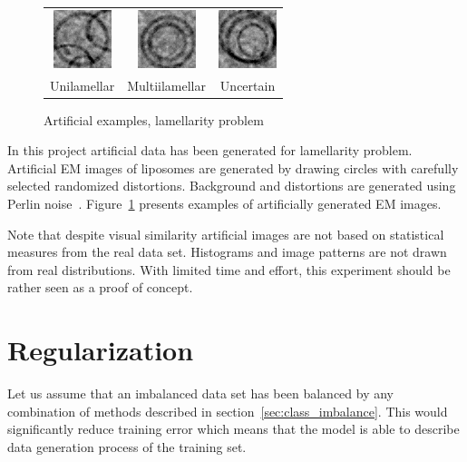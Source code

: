 \documentclass[a4paper, 11pt, table]{article}
\begin{document}
\begin{figure}[H]
\centering
\begin{tabular}{ccc}
	\includegraphics[scale=1.5]{synthetic/uni.png} & \includegraphics[scale=1.5]{synthetic/multi.png} & \includegraphics[scale=1.5]{synthetic/uncertain.png} \\
	Unilamellar & Multiilamellar & Uncertain \\[6pt]
\end{tabular}
\caption{Artificial examples, lamellarity problem}
\label{fig:synthetic_images}
\end{figure}

In this project artificial data has been generated for lamellarity problem. Artificial EM images of liposomes are generated by drawing circles with carefully selected randomized distortions. Background and distortions are generated using Perlin noise~\cite{Perlin:1985:IS:325165.325247}. Figure~\ref{fig:synthetic_images} presents examples of artificially generated EM images.

Note that despite visual similarity artificial images are not based on statistical measures from the real data set. Histograms and image patterns are not drawn from real distributions. With limited time and effort, this experiment should be rather seen as a proof of concept.

\section{Regularization}
\label{sec:regularization}

Let us assume that an imbalanced data set has been balanced by any combination of methods described in section~\ref{sec:class_imbalance}. This would significantly reduce training error which means that the model is able to describe data generation process of the training set. 
\end{document}
